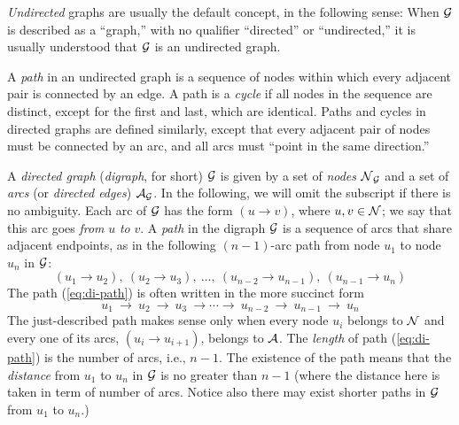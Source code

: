 {\em Undirected} graphs are usually the default concept, in the
following sense: When $\mbox{$\cal G$}$ is described as a ``graph,'' with no
qualifier ``directed'' or ``undirected,'' it is usually understood
that $\mbox{$\cal G$}$ is an undirected graph.
\medskip

A {\em path}   in
an undirected graph is a sequence of nodes within which every adjacent
pair is connected by an edge.  A path is a {\em cycle}
  if all nodes in the
sequence are distinct, except for the first and last, which are
identical.  Paths and cycles in directed graphs are defined similarly,
except that every adjacent pair of nodes must be connected by an arc,
and all arcs must ``point in the same direction.''
\bigskip

A {\it directed graph}  ({\it digraph},
 for short) $\mbox{$\cal G$}$ is given by a set of {\it nodes}
$\mbox{$\cal N$}_{\mbox{{\scriptsize $\cal G$}}}$ and a set of {\it arcs}
(or {\it directed edges}) $\mbox{$\cal A$}_{\mbox{{\scriptsize $\cal G$}}}$.
In the following, we will omit the subscript if there is no ambiguity.
Each arc of $\mbox{$\cal G$}$ has the form $(u \rightarrow v)$,
where $u, v \in \mbox{$\cal N$}$; we say that this arc goes {\em from} $u$
{\em to} $v$.  A {\it path} 
in the digraph $\mbox{$\cal G$}$ is a sequence of arcs that share adjacent
endpoints, as in the following $(n-1)$-arc path from node $u_1$ to
node $u_n$ in $\mbox{$\cal G$}$:
\begin{equation}
\label{eq:di-path}
(u_1 \rightarrow u_2), \ (u_2 \rightarrow u_3), \ \ldots, \ (u_{n-2}
        \rightarrow u_{n-1}), \ (u_{n-1} \rightarrow u_n)
\end{equation}
The path (\ref{eq:di-path}) is often written in the more succinct form
\[
u_1 \ \rightarrow \ u_2 \ \rightarrow \ u_3 \ \rightarrow \cdots
\rightarrow \ u_{n-2} \ \rightarrow \ u_{n-1} \ \rightarrow \ u_n
\]
The just-described path makes sense only when every node $u_i$ belongs
to $\mbox{$\cal N$}$ and every one of its arcs, $(u_i \rightarrow u_{i+1})$,
belongs to $\mbox{$\cal A$}$.  The {\it length} of path (\ref{eq:di-path}) is
the number of arcs, i.e., $n-1$.  The existence of the path means that
the {\it distance} 
  from
$u_1$ to $u_n$ in $\mbox{$\cal G$}$ is no greater than $n-1$ (where the distance here is taken in term of number of arcs.  
Notice also there may exist shorter paths in $\mbox{$\cal G$}$ from $u_1$ to $u_n$.)
\bigskip

